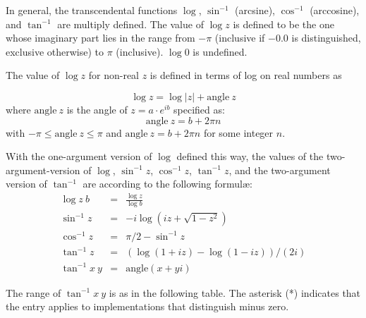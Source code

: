 In general, the transcendental functions $\log$, $\sin^{-1}$
(arcsine), $\cos^{-1}$ (arccosine), and $\tan^{-1}$ are multiply
defined.  The value of $\log z$ is defined to be the one whose
imaginary part lies in the range from $-\pi$ (inclusive if $-0.0$ is
distinguished, exclusive otherwise) to $\pi$ (inclusive).  $\log 0$ is
undefined.

The value of $\log z$ for non-real $z$ is defined in terms of log on real numbers as 

\begin{displaymath}
\log z = \log |z| + \mathrm{angle}~z
\end{displaymath}
%
where $\mathrm{angle}~z$ is the angle of $z = a\cdot e^{ib}$ specified
as:
$$\mathrm{angle}~z = b+2\pi n$$
with $-\pi \leq \mathrm{angle}~z\leq \pi$ and $\mathrm{angle}~z =
b+2\pi n$ for some integer $n$.

With the one-argument version of $\log$ defined this way, the values
of the two-argument-version of $\log$, $\sin^{-1} z$, $\cos^{-1} z$,
$\tan^{-1} z$, and the two-argument version of $\tan^{-1}$ are
according to the following formul\ae:
\begin{eqnarray*}
\log z~b &=& \frac{\log z}{\log b}\\
\sin^{-1} z &=& -i \log (i z + \sqrt{1 - z^2})\\
\cos^{-1} z &=& \pi / 2 - \sin^{-1} z\\
\tan^{-1} z &=& (\log (1 + i z) - \log (1 - i z)) / (2 i)\\
\tan^{-1} x~y &=& \mathrm{angle}(x+ yi)
\end{eqnarray*}

The range of $\tan^{-1} x~y$ is as in the following table. The
asterisk (*) indicates that the entry applies to implementations that
distinguish minus zero.

